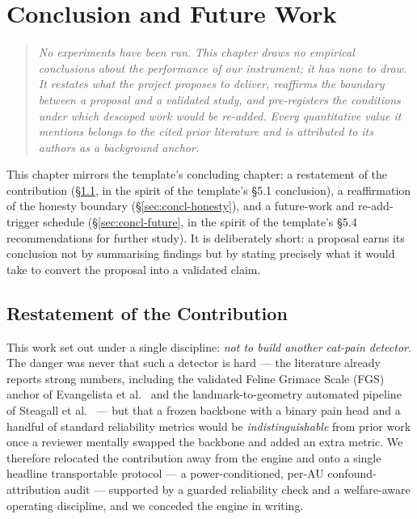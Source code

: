 
\chapter{Conclusion and Future Work}
\label{ch:conclusion}

\begin{quote}\small\itshape
No experiments have been run. This chapter draws no empirical conclusions about
the performance of our instrument; it has none to draw. It restates what the
project \emph{proposes} to deliver, reaffirms the boundary between a proposal and
a validated study, and pre-registers the conditions under which descoped work
would be re-added. Every quantitative value it mentions belongs to the cited prior
literature and is attributed to its authors as a background anchor.
\end{quote}

This chapter mirrors the template's concluding chapter: a restatement of the
contribution (\S\ref{sec:concl-contribution}, in the spirit of the template's
\S5.1 conclusion), a reaffirmation of the honesty boundary
(\S\ref{sec:concl-honesty}), and a future-work and re-add-trigger schedule
(\S\ref{sec:concl-future}, in the spirit of the template's \S5.4 recommendations
for further study). It is deliberately short: a proposal earns its conclusion not
by summarising findings but by stating precisely what it would take to convert the
proposal into a validated claim.

\section{Restatement of the Contribution}
\label{sec:concl-contribution}

This work set out under a single discipline: \emph{not to build another cat-pain
detector}. The danger was never that such a detector is hard --- the literature
already reports strong numbers, including the validated Feline Grimace Scale (FGS)
anchor of Evangelista et al.\ \cite{evangelista2019} and the landmark-to-geometry
automated pipeline of Steagall et al.\ \cite{steagall2023} --- but that a frozen
backbone with a binary pain head and a handful of standard reliability metrics
would be \emph{indistinguishable} from prior work once a reviewer mentally swapped
the backbone and added an extra metric. We therefore relocated the contribution
away from the engine and onto a single headline transportable protocol --- a
power-conditioned, per-AU confound-attribution audit --- supported by a guarded
reliability check and a welfare-aware operating discipline, and we conceded the
engine in writing.

